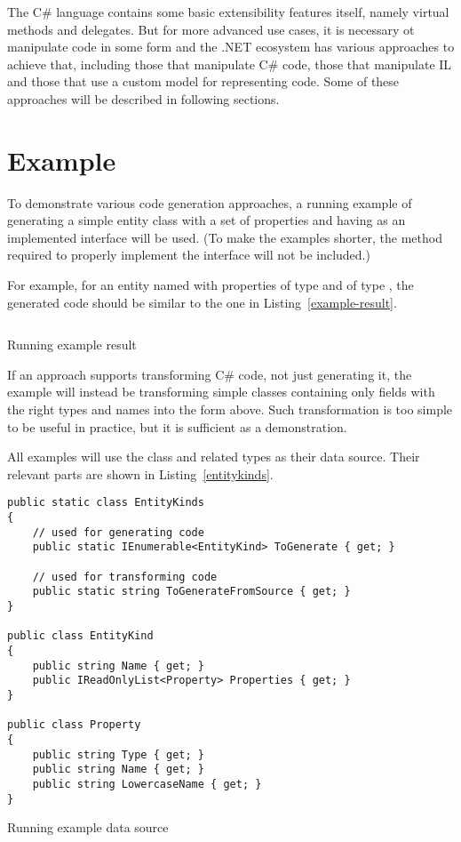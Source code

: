 \medskip

The C\# language contains some basic extensibility features itself, namely virtual methods and delegates.
But for more advanced use cases, it is necessary ot manipulate code in some form and the .NET ecosystem has various approaches to achieve that, including those that manipulate C\# code, those that manipulate \ac{IL} and those that use a custom model for representing code. Some of these approaches will be described in following sections.

\section{Example}
\label{running-example}

To demonstrate various code generation approaches, a running example of generating a simple entity class with a set of properties and having  as an implemented interface will be used. (To make the examples shorter, the  method required to properly implement the interface will not be included.)

For example, for an entity named  with properties  of type  and  of type , the generated code should be similar to the one in Listing~\ref{example-result}.

\begin{listing}
\inputminted{csharp}{samples/Core/Person.cs}
\caption{Running example result}
\label{example-result}
\end{listing}

If an approach supports transforming C\# code, not just generating it, the example will instead be transforming simple classes containing only fields with the right types and names into the form above. Such transformation is too simple to be useful in practice, but it is sufficient as a demonstration.

All examples will use the  class and related types as their data source. Their relevant parts are shown in Listing~\ref{entitykinds}.

\begin{listing}
\begin{verbatim}
public static class EntityKinds
{
    // used for generating code
    public static IEnumerable<EntityKind> ToGenerate { get; }
    
    // used for transforming code
    public static string ToGenerateFromSource { get; }
}

public class EntityKind
{
    public string Name { get; }
    public IReadOnlyList<Property> Properties { get; }
}

public class Property
{
    public string Type { get; }
    public string Name { get; }
    public string LowercaseName { get; }
}
\end{verbatim}
\caption{Running example data source}
\label{entitykinds}
\end{listing}

